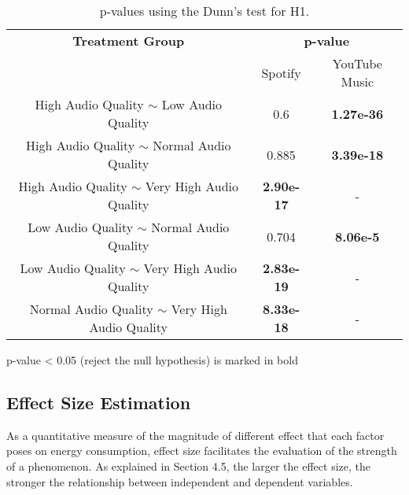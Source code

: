 \begin{table}[t]
\centering
\caption{p-values using the Dunn’s test for H1.}
\begin{threeparttable}
\label{table1}
\begin{tabular}{|c|c|c|}
\hline
\textbf{Treatment Group} & \multicolumn{2}{c|}{\textbf{p-value}}\\
\cline{2-3}

&Spotify&YouTube Music
\\ 
\hline
\makecell{High Audio Quality $\sim$ \\Low Audio Quality}
&0.6
&\textbf{1.27e-36}

\\
\hline

\makecell{High Audio Quality $\sim$ \\Normal Audio Quality}
&0.885
&\textbf{3.39e-18}

 \\
\hline

\makecell{High Audio Quality $\sim$  \\Very High Audio Quality}
&\textbf{2.90e-17}
&- 
\\
\hline
\makecell{Low Audio Quality $\sim$ \\Normal Audio Quality}
&0.704
&\textbf{8.06e-5}
\\
\hline
\makecell{Low Audio Quality $\sim$ \\ Very High Audio Quality}
&\textbf{2.83e-19}
&-
\\
\hline
\makecell{Normal Audio Quality $\sim$ \\Very High Audio Quality}
&\textbf{8.33e-18}
&-
\\
\hline


\end{tabular}
\label{table_MAP}
 \begin{tablenotes}
        \footnotesize
        \item * p-value < 0.05 (\ie reject the null hypothesis) is marked in bold 
      \end{tablenotes}
  \end{threeparttable}
\end{table}

\subsection{Effect Size Estimation }
As a quantitative measure of the magnitude of different effect that each factor poses on energy consumption, effect size facilitates the evaluation of the strength of a phenomenon. As explained in Section 4.5, the larger the effect size, the stronger the relationship between independent and dependent variables. 

